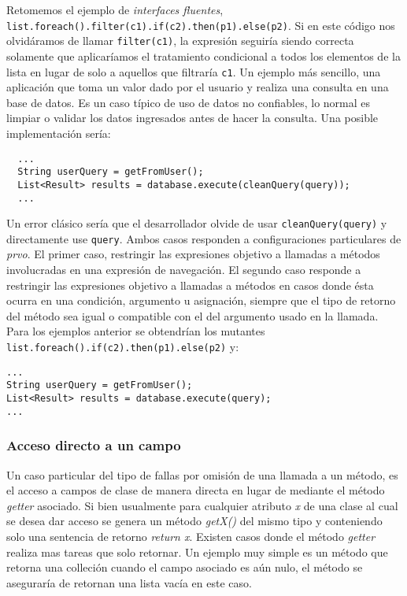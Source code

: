 Retomemos el ejemplo de \emph{interfaces fluentes}, \lstinline|list.foreach().filter(c1).if(c2).then(p1).else(p2)|. Si en este c\'odigo nos olvid\'aramos de llamar \texttt{filter(c1)}, la expresi\'on seguir\'ia siendo correcta solamente que aplicar\'iamos el tratamiento condicional a todos los elementos de la lista en lugar de solo a aquellos que filtrar\'ia \texttt{c1}. Un ejemplo m\'as sencillo, una aplicaci\'on que toma un valor dado por el usuario y realiza una consulta en una base de datos. Es un caso t\'ipico de uso de datos no confiables, lo normal es limpiar o validar los datos ingresados antes de hacer la consulta. Una posible implementaci\'on ser\'ia:
\begin{lstlisting}
  ...
  String userQuery = getFromUser();
  List<Result> results = database.execute(cleanQuery(query));
  ...
\end{lstlisting}
Un error cl\'asico ser\'ia que el desarrollador olvide de usar \texttt{cleanQuery(query)} y directamente use \texttt{query}. Ambos casos responden a configuraciones particulares de \emph{prvo}. El primer caso, restringir las expresiones objetivo a llamadas a m\'etodos involucradas en una expresi\'on de navegaci\'on. El segundo caso responde a restringir las expresiones objetivo a llamadas a m\'etodos en casos donde \'esta ocurra en una condici\'on, argumento u asignaci\'on, siempre que el tipo de retorno del m\'etodo sea igual o compatible con el del argumento usado en la llamada. Para los ejemplos anterior se obtendr\'ian los mutantes \lstinline|list.foreach().if(c2).then(p1).else(p2)| y:
\begin{lstlisting}
...
String userQuery = getFromUser();
List<Result> results = database.execute(query);
...
\end{lstlisting}

\subsubsection{Acceso directo a un campo}

Un caso particular del tipo de fallas por omisi\'on de una llamada a un m\'etodo, es el acceso a campos de clase de manera directa en lugar de mediante el m\'etodo \emph{getter} asociado. Si bien usualmente para cualquier atributo \emph{x} de una clase al cual se desea dar acceso se genera un m\'etodo \emph{getX()} del mismo tipo y conteniendo solo una sentencia de retorno \emph{return x}. Existen casos donde el m\'etodo \emph{getter} realiza mas tareas que solo retornar. Un ejemplo muy simple es un m\'etodo que retorna una colleci\'on cuando el campo asociado es a\'un nulo, el m\'etodo se asegurar\'ia de retornan una lista vac\'ia en este caso.

